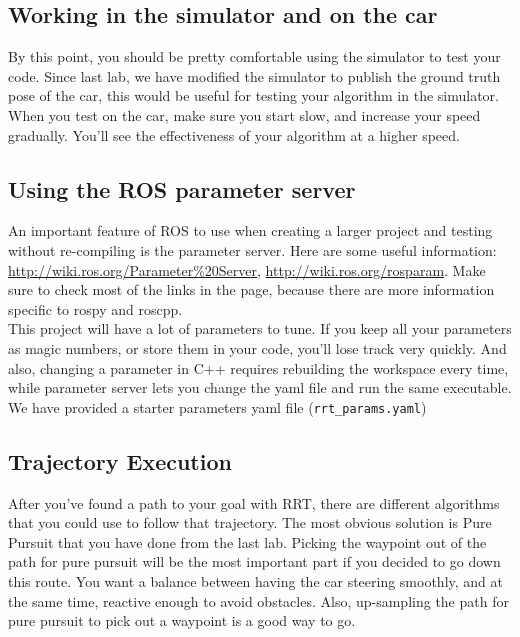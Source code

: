 \documentclass[letter]{article}
\begin{document}
\subsection{Working in the simulator and on the car}
By this point, you should be pretty comfortable using the simulator to test your code. Since last lab, we have modified the simulator to publish the ground truth pose of the car, this would be useful for testing your algorithm in the simulator. When you test on the car, make sure you start slow, and increase your speed gradually. You'll see the effectiveness of your algorithm at a higher speed.\\

\subsection{Using the ROS parameter server}
An important feature of ROS to use when creating a larger project and testing without re-compiling is the parameter server. Here are some useful information: \href{http://wiki.ros.org/Parameter\%20Server}{http://wiki.ros.org/Parameter\%20Server}, \href{http://wiki.ros.org/rosparam}{http://wiki.ros.org/rosparam}. Make sure to check most of the links in the page, because there are more information specific to rospy and roscpp.\\
This project will have a lot of parameters to tune. If you keep all your parameters as magic numbers, or store them in your code, you'll lose track very quickly. And also, changing a parameter in C++ requires rebuilding the workspace every time, while parameter server lets you change the yaml file and run the same executable. We have provided a starter parameters yaml file (\texttt{rrt\_params.yaml})\\
\subsection{Trajectory Execution}
After you've found a path to your goal with RRT, there are different algorithms that you could use to follow that trajectory. The most obvious solution is Pure Pursuit that you have done from the last lab. Picking the waypoint out of the path for pure pursuit will be the most important part if you decided to go down this route. You want a balance between having the car steering smoothly, and at the same time, reactive enough to avoid obstacles. Also, up-sampling the path for pure pursuit to pick out a waypoint is a good way to go.\\
\end{document}
